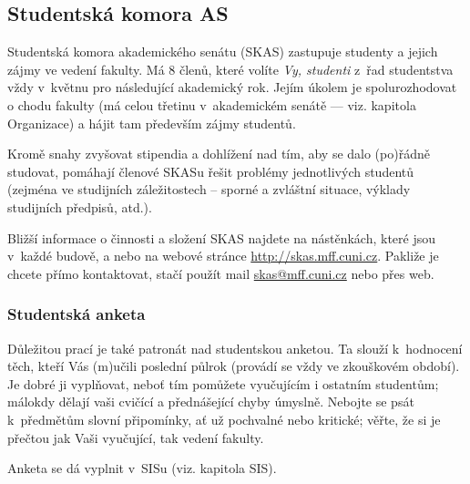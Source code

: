 \subsection[SKAS (Studentská komora akademického senátu)]{Studentská komora AS}
Studentská komora akademického senátu (SKAS) zastupuje studenty a jejich zájmy ve vedení fakulty. Má 8 členů, které volíte \emph{Vy, studenti} z~řad studentstva vždy v~květnu pro následující akademický rok. Jejím úkolem je spolurozhodovat o chodu fakulty (má celou třetinu v~akademickém senátě --- viz. kapitola Organizace) a hájit tam především zájmy studentů.

Kromě snahy zvyšovat stipendia a dohlížení nad tím, aby se dalo (po)řádně studovat, pomáhají členové SKASu řešit problémy jednotlivých studentů (zejména ve studijních záležitostech – sporné a zvláštní situace, výklady studijních předpisů, atd.). 

Bližší informace o činnosti a složení SKAS najdete na nástěnkách, které jsou v~každé budově, a nebo na webové stránce \url{http://skas.mff.cuni.cz}. Pakliže je chcete přímo kontaktovat, stačí použít mail \url{skas@mff.cuni.cz} nebo přes web.

\subsubsection{Studentská anketa}
Důležitou prací je také patronát nad studentskou anketou. Ta slouží k~hodnocení těch, kteří Vás (m)učili poslední půlrok (provádí se vždy ve zkouškovém období). Je dobré ji vyplňovat, neboť tím pomůžete vyučujícím i ostatním
studentům; málokdy dělají vaši cvičící a přednášející chyby
úmyslně. Nebojte se psát k~předmětům slovní připomínky, ať už
pochvalné nebo kritické; věřte, že si je přečtou jak Vaši
vyučující, tak vedení fakulty.

Anketa se dá vyplnit v~SISu (viz. kapitola SIS).

